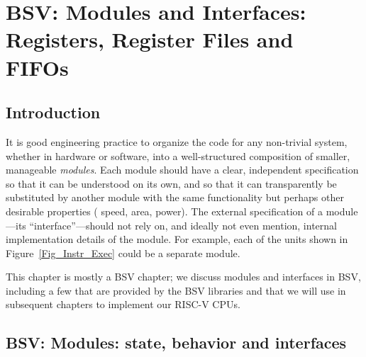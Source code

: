 

\chapter{BSV: Modules and Interfaces: Registers, Register Files and FIFOs}


\setcounter{page}{1}
\renewcommand{\thepage}{\arabic{chapter}-\arabic{page}}

\label{ch_Modules_and_Interfaces}


\section{Introduction}

It is good engineering practice to organize the code for any
non-trivial system, whether in hardware or software, into a
well-structured composition of smaller, manageable \emph{modules}.
Each module should have a clear, independent specification so that it
can be understood on its own, and so that it can transparently be
substituted by another module with the same functionality but perhaps
other desirable properties ({\eg} speed, area, power).  The external
specification of a module---its ``interface''---should not rely on,
and ideally not even mention, internal implementation details of the
module.  For example, each of the units shown in
Figure~\ref{Fig_Instr_Exec} could be a separate module.

This chapter is mostly a BSV chapter; we discuss modules and
interfaces in BSV, including a few that are provided by the BSV
libraries and that we will use in subsequent chapters to implement our
RISC-V CPUs.


\section{BSV: Modules: state, behavior and interfaces}

\label{Sec_Modules}


